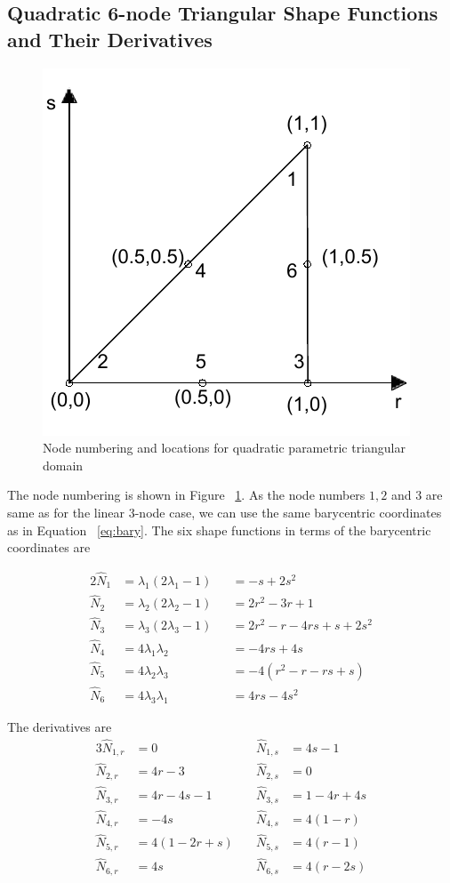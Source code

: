 \documentclass[../main.tex]{subfiles}
\begin{document}
\subsection{Quadratic 6-node Triangular Shape Functions and Their
  Derivatives}
\begin{figure}[h]
  \centering
  \includegraphics[scale=1]{./img/quadraticDomain.pdf}
  \caption{Node numbering and locations for quadratic parametric
    triangular domain}
  \label{fig:quadDom}
\end{figure}
The node numbering is shown in Figure ~\ref{fig:quadDom}. As the node
numbers $1,2$ and $3$ are same as for the linear 3-node case, we can
use the same barycentric coordinates as in Equation
~\ref{eq:bary}. The six shape functions in terms of the barycentric
coordinates are
\begin{center}
  \begin{alignat*}{2}
    \hat{N}_1 &= \lambda_1(2\lambda_1-1) &&= -s+2s^2 \\
    \hat{N}_2 &= \lambda_2(2\lambda_2-1) &&= 2r^2-3r+1\\
    \hat{N}_3 &= \lambda_3(2\lambda_3-1) &&= 2r^2-r-4rs+s+2s^2\\
    \hat{N}_4 &= 4\lambda_1\lambda_2 &&= -4rs +4s \\
    \hat{N}_5 &= 4\lambda_2\lambda_3 &&=  -4(r^2-r-rs+s)\\
    \hat{N}_6 &= 4\lambda_3\lambda_1 &&= 4rs-4s^2
  \end{alignat*}
\end{center}
The derivatives are
\begin{alignat*}{3}
  \hat{N}_{1,r} &= 0 &\quad\hat{N}_{1,s} &= 4s-1 \\
  \hat{N}_{2,r} &= 4r-3 &\quad\hat{N}_{2,s}&= 0 \\
  \hat{N}_{3,r} &= 4r-4s-1&\quad\hat{N}_{3,s} &= 1-4r+4s \\
  \hat{N}_{4,r} &= -4s &\quad\hat{N}_{4,s} &= 4(1-r) \\
  \hat{N}_{5,r} &= 4(1-2r+s)&\quad\hat{N}_{5,s} &= 4(r-1) \\
  \hat{N}_{6,r} &= 4s&\quad\hat{N}_{6,s} &= 4(r-2s)
\end{alignat*}
\end{document}
